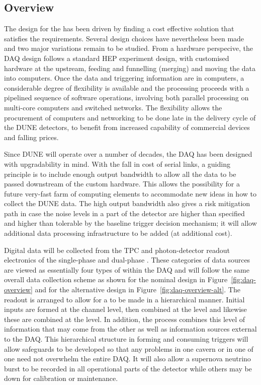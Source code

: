 \subsection{Overview}
\label{sec:fd-daq-overview}

The design for the  has been driven by finding a cost
effective solution that satisfies the requirements. Several design
choices have nevertheless been made and two major variations remain to
be studied. 
From a hardware perspecive, the DAQ design follows a standard HEP
experiment design, with customised hardware at the upstream, feeding
and funnelling (merging) and moving the data into computers. 
Once the data and triggering information are in computers, a
considerable degree of flexibility is available and the processing
proceeds with a pipelined sequence of software operations, involving
both parallel processing on multi-core computers and switched
networks. The flexibility allows the procurement of computers and
networking to be done late in the delivery cycle of the DUNE
detectors, to benefit from increased capability of commercial devices
and falling prices.

Since DUNE will operate over a number of decades, the DAQ has been
designed with upgradability in mind. 
With the fall in cost of serial links, a guiding principle is to
include enough output bandwidth to allow all the data to be passed
downstream of the custom hardware.
This allows the possibility for a future very-fast farm of computing
elements to accommodate new ideas in how to collect the DUNE data. 
The high output bandwidth also gives a risk mitigation path in case
the noise levels in a part of the detector are higher than specified
and higher than tolerable by the baseline trigger decision mechanism;
it will allow additional data processing infrastructure to be added
(at additional cost).

Digital data will be collected from the TPC and photon-detector
readout electronics of the single-phase and dual-phase
. 
These categories of data sources are viewed as essentially four types
of  within the DAQ and will follow the same overall
data collection scheme as shown for the nominal design in
Figure~\ref{fig:daq-overview} and for the alternative design in
Figure~\ref{fig:daq-overview-alt}. 
The readout is arranged to allow for a  to be made
in a hierarchical manner. 
Initial inputs are formed at the channel level, then combined at the
 level and likewise these are combined at the
 level.
In addition, the  process combines this level of
information that may come from the other  as well as
information sources external to the DAQ. 
This hierarchical structure in forming and consuming triggers will
allow safeguards to be developed so that any problems in one cavern or
in one  of one  need not overwhelm the
entire DAQ.
It will also allow a supernova neutrino burst to be recorded in all
operational parts of the detector while others may be down for
calibration or maintenance.

